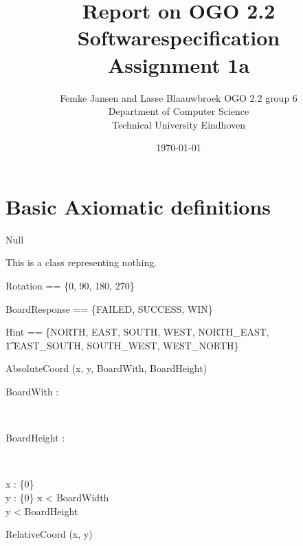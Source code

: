 \documentclass[12pt]{article}
\title{Report on OGO 2.2 Softwarespecification\\ Assignment 1a}
\author{
        Femke Jansen and Lasse Blaauwbroek OGO 2.2 group 6 \\
                Department of Computer Science\\
        Technical University Eindhoven\\
}
\date{\today}
\begin{document}
\maketitle

\begin{abstract}

\end{abstract}

\section{Basic Axiomatic definitions}

\begin{class}{Null}
\begin{classcom}
This is a class representing nothing.
\end{classcom}
\end{class}

\begin{axdef}
Rotation == \{0, 90, 180, 270\}
\end{axdef}

\begin{axdef}
BoardResponse == \{FAILED, SUCCESS, WIN\}
\end{axdef}

\begin{axdef}
Hint == \{NORTH, EAST, SOUTH, WEST, NORTH\_EAST, \\ \t1 EAST\_SOUTH, SOUTH\_WEST, WEST\_NORTH\}
\end{axdef}

\begin{class}{AbsoluteCoord}
\upharpoonright (x, y, BoardWith, BoardHeight) \\
\begin{axdef}
BoardWith : \nat
\end{axdef} \\
\begin{axdef}
BoardHeight : \nat
\end{axdef} \\
\begin{state}
x : \nat \cup \{0\} \\
y : \nat \cup \{0\}
\where
x < BoardWidth \\
y < BoardHeight
\end{state}
\end{class}

\begin{class}{RelativeCoord}
\upharpoonright (x, y) \\
\end{class}
\end{document}
